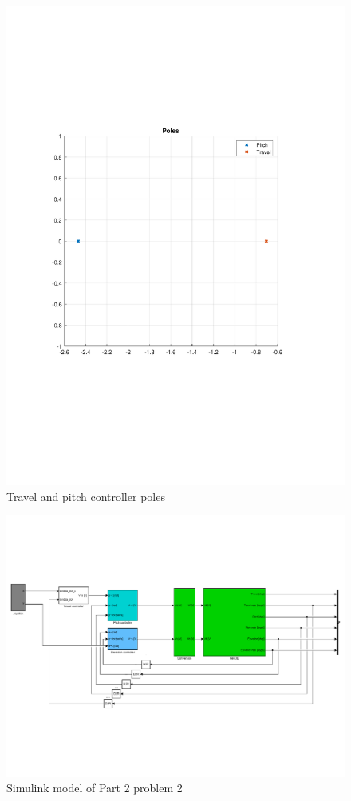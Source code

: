\begin{figure}[!!ht!!!!!!!!tb!!]
	\begin{minipage}{0.5\textwidth}
    	\centering
		\includegraphics[width=1\textwidth,trim={2cm 7cm 3cm 6cm},clip]{figures/Travel_controller.pdf}
    	\caption{Travel and pitch controller poles}
	\end{minipage}
\label{fig:P2p2_poles}
\end{figure}
\clearpage
\begin{figure}[!!ht!!!!!!!!tb!!]
    	\centering
		\includegraphics[width=1.1\textwidth,trim={0cm 3cm 0cm 5cm},clip]{figures/simulink/P2p2.pdf}
    	\caption{Simulink model of Part 2 problem 2}
\label{fig:P2p2_system}
\end{figure}
